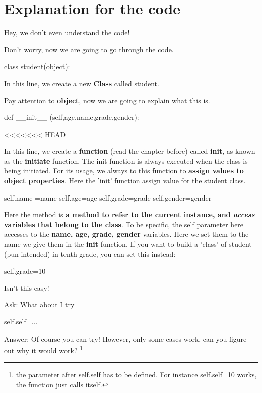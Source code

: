 \documentclass[12pt]{article}
\begin{document}
\section{Explanation for the code}
\begin{tcolorbox}[colback=blue!5!white,colframe=blue!50!white,title=Reader's Complain]
	Hey, we don't even understand the code!
\end{tcolorbox}
\par Don't worry, now we are going to go through the code.
\begin{python}
	class student(object):
\end{python}
\par In this line, we create a new \textbf{Class} called student.
\par Pay attention to \textbf{object}, now we are going to explain what this is.
\begin{python}
	def __init__ (self,age,name,grade,gender):
\end{python}
<<<<<<< HEAD
\par In this line, we create a \textbf{function} (read the chapter before) called \textbf{init}, 
as known as the \textbf{initiate} function.
The init function is always executed when the class is being initiated.
For its usage, we always to this function to \textbf{assign values to object properties}. Here the 'init' function assign value for the student class.
\begin{python}
	self.name =name
	self.age=age
	self.grade=grade
	self.gender=gender
\end{python}
Here the  method is \textbf{a method to refer to the current instance, and \textit{access} variables that belong to the class}.
To be specific, the self parameter here accesses to the \textbf{name, age, grade, gender} variables. Here we set them to the name we give them in the \textbf{init} function. If you want to build a 'class' of student (pun intended) in tenth grade, you can set this instead:
\begin{python}
	self.grade=10
\end{python}
Isn't this easy!
\begin{tcolorbox}[colback=red!5!white,colframe=white!50!red,title=Reader's Complain]
	Ask: What about I try
	\begin{python}
		self.self=...
	\end{python}
	Answer: Of course you can try! However, only some cases work, can you figure out why it would work? \footnote[1]{the parameter after self.self has to be defined. For instance self.self=10 works, the function just calls itself.}
\end{tcolorbox}
\end{document}

